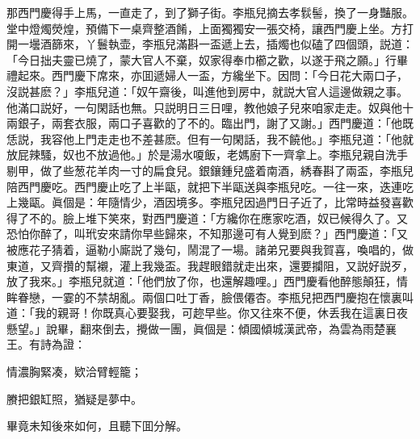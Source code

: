 那西門慶得手上馬，一直走了，到了獅子街。李瓶兒摘去孝䯼髻，換了一身豔服。堂中燈燭熒煌，預備下一桌齊整酒餚，上面獨獨安一張交椅，讓西門慶上坐。方打開一壜酒篩來，丫鬟執壶，李瓶兒滿斟一盃遞上去，插燭也似磕了四個頭，説道：「今日拙夫靈已燒了，蒙大官人不棄，奴家得奉巾櫛之歡，以遂于飛之願。」行畢禮起來。西門慶下席來，亦囬遞婦人一盃，方纔坐下。因問：「今日花大兩口子，沒説甚麽？」李瓶兒道：「奴午齋後，叫進他到房中，就説大官人這邊做親之事。他滿口説好，一句閑話也無。只説明日三日哩，教他娘子兒來咱家走走。奴與他十兩銀子，兩套衣服，兩口子喜歡的了不的。臨出門，謝了又謝。」西門慶道：「他既恁説，我容他上門走走也不差甚麽。但有一句閑話，我不饒他。」李瓶兒道：「他就放屁辣騷，奴也不放過他。」於是湯水嗄飯，老媽廚下一齊拿上。李瓶兒親自洗手剔甲，做了些葱花羊肉一寸的扁食兒。銀鑲鍾兒盛着南酒，綉春斟了兩盃，李瓶兒陪西門慶吃。西門慶止吃了上半甌，就把下半甌送與李瓶兒吃。一往一來，迭連吃上幾甌。眞個是：年隨情少，酒因境多。李瓶兒因過門日子近了，比常時益發喜歡得了不的。臉上堆下笑來，對西門慶道：「方纔你在應家吃酒，奴已候得久了。又恐怕你醉了，叫玳安來請你早些歸來，不知那邊可有人覺到麽？」西門慶道：「又被應花子猜着，逼勒小廝説了幾句，鬧混了一場。諸弟兄要與我賀喜，喚唱的，做東道，又齊攢的幫襯，灌上我幾盃。我趕眼錯就走出來，還要攔阻，又説好説歹，放了我來。」李瓶兒就道：「他們放了你，也還解趣哩。」西門慶看他醉態顛狂，情眸眷戀，一霎的不禁胡亂。兩個口吐丁香，臉偎僊杏。李瓶兒把西門慶抱在懷裏叫道：「我的親哥！你既真心要娶我，可趂早些。你又往來不便，休丢我在這裏日夜懸望。」說畢，翻來倒去，攪做一團，眞個是：傾國傾城漢武帝，為雲為雨楚襄王。有詩為證：

\begin{myquote}
情濃胸緊凑，欵洽臂輕籠；

賸把銀缸照，猶疑是夢中。
\end{myquote}

畢竟未知後來如何，且聽下囬分解。


